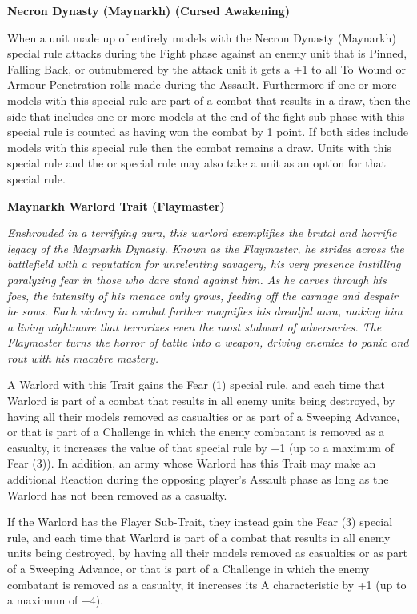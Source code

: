 \begin{multicols}{2}
\textbf{Necron Dynasty (Maynarkh) (Cursed Awakening)} 

When a unit made up of entirely models with the Necron Dynasty (Maynarkh) special rule attacks during the Fight phase against an enemy unit that is Pinned, Falling Back, or outnubmered by the attack unit it gets a +1 to all To Wound or Armour Penetration rolls made during the Assault. Furthermore if one or more models with this special rule are part of a combat that results in a draw, then the side that includes one or more models at the end of the fight sub-phase with this special rule is counted as having won the combat by 1 point. If both sides include models with this special rule then the combat remains a draw. Units with this special rule and the  or  special rule may also take a  unit as an option for that special rule.

\textbf{Maynarkh Warlord Trait (Flaymaster)} 

\textit{Enshrouded in a terrifying aura, this warlord exemplifies the brutal and horrific legacy of the Maynarkh Dynasty. Known as the Flaymaster, he strides across the battlefield with a reputation for unrelenting savagery, his very presence instilling paralyzing fear in those who dare stand against him. As he carves through his foes, the intensity of his menace only grows, feeding off the carnage and despair he sows. Each victory in combat further magnifies his dreadful aura, making him a living nightmare that terrorizes even the most stalwart of adversaries. The Flaymaster turns the horror of battle into a weapon, driving enemies to panic and rout with his macabre mastery.}

A Warlord with this Trait gains the Fear (1) special rule, and each time that Warlord is part of a combat that results in all enemy units being destroyed, by having all their models removed as casualties or as part of a Sweeping Advance, or that is part of a Challenge in which the enemy combatant is removed as a casualty, it increases the value of that special rule by +1 (up to a maximum of Fear (3)). In addition, an army whose Warlord has this Trait may make an additional Reaction during the opposing player’s Assault phase as long as the Warlord has not been removed as a casualty.

If the Warlord has the Flayer Sub-Trait, they instead gain the Fear (3) special rule, and each time that Warlord is part of a combat that results in all enemy units being destroyed, by having all their models removed as casualties or as part of a Sweeping Advance, or that is part of a Challenge in which the enemy combatant is removed as a casualty, it increases its A characteristic by +1 (up to a maximum of +4).
\end{multicols}



